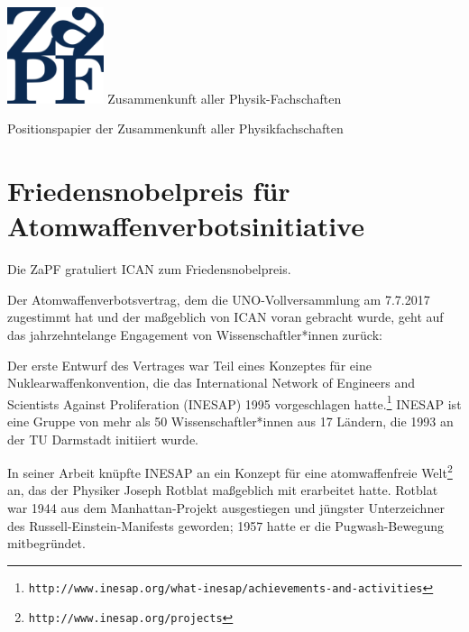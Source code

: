 \documentclass[DIV=calc]{scrartcl}
\begin{document}
    \hspace{0.87\textwidth}
    \begin{minipage}{120pt}
        \vspace{-1.8cm}
        \includegraphics[width=80pt]{../../logo.pdf}
        \centering
        \small Zusammenkunft aller Physik-Fachschaften
    \end{minipage}
    \begin{center}
        \huge{Positionspapier der Zusammenkunft aller Physikfachschaften}\vspace{.25\baselineskip}\\
        \normalsize
    \end{center}
    \vspace{1cm} 
%       
\section*{Friedensnobelpreis für Atomwaffenverbotsinitiative}
Die ZaPF gratuliert ICAN zum Friedensnobelpreis.

Der Atomwaffenverbotsvertrag, dem die UNO-Vollversammlung am 7.7.2017 zugestimmt hat und der maßgeblich von ICAN voran gebracht wurde, geht auf das jahrzehntelange Engagement von Wissenschaftler*innen zurück:

Der erste Entwurf des Vertrages war Teil eines Konzeptes für eine Nuklearwaffenkonvention, die das International Network of Engineers and Scientists Against Proliferation (INESAP) 1995 vorgeschlagen hatte.\footnote{\texttt{http://www.inesap.org/what-inesap/achievements-and-activities}} INESAP ist eine Gruppe von mehr als 50 Wissenschaftler*innen aus 17 Ländern, die 1993 an der TU Darmstadt initiiert wurde.

In seiner Arbeit knüpfte INESAP an ein Konzept für eine atomwaffenfreie Welt\footnote{\texttt{http://www.inesap.org/projects}} an, das der Physiker Joseph Rotblat maßgeblich mit erarbeitet hatte. Rotblat war 1944 aus dem Manhattan-Projekt ausgestiegen und jüngster Unterzeichner des Russell-Einstein-Manifests geworden; 1957 hatte er die Pugwash-Bewegung mitbegründet.
\end{document}
